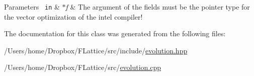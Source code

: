 \begin{DoxyParams}[1]{Parameters}
\mbox{\texttt{ in}}  & {\em $\ast$f} & The argument of the fields must be the pointer type for the vector optimization of the intel compiler! \\
\hline
\end{DoxyParams}


The documentation for this class was generated from the following files\+:\begin{DoxyCompactItemize}
\item 
/\+Users/home/\+Dropbox/\+F\+Lattice/src/include/\mbox{\hyperlink{evolution_8hpp}{evolution.\+hpp}}\item 
/\+Users/home/\+Dropbox/\+F\+Lattice/src/\mbox{\hyperlink{evolution_8cpp}{evolution.\+cpp}}\end{DoxyCompactItemize}
